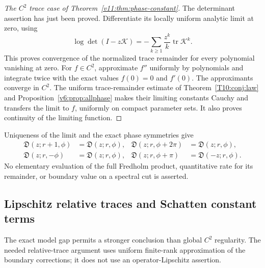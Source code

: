 \begin{proof}[The $C^2$ trace case of Theorem~\ref{v11:thm:phase-constant}]
The determinant assertion has just been proved.  Differentiate its
locally uniform analytic limit at zero, using
\[
 \log\det(I-z\mathcal K)
       =-\sum_{k\ge1}\frac{z^k}{k}\operatorname{tr}\mathcal K^k.
\]
This proves convergence of the normalized trace remainder for every
polynomial vanishing at zero.  For $f\in C^2$, approximate $f''$
uniformly by polynomials and integrate twice with the exact values
$f(0)=0$ and $f'(0)$.  The approximants converge in $C^2$.
The uniform trace-remainder estimate of
Theorem~\ref{T10:conj:law} and Proposition~\ref{v6:prop:allphase}
makes their limiting constants Cauchy and transfers the limit to $f$,
uniformly on compact parameter sets.  It also proves continuity of the
limiting function.
\end{proof}

Uniqueness of the limit and the exact phase symmetries give
\begin{align*}
 \mathfrak D(z;r+1,\phi)&=\mathfrak D(z;r,\phi),&
 \mathfrak D(z;r,\phi+2\pi)&=\mathfrak D(z;r,\phi),\\
 \mathfrak D(z;r,-\phi)&=\mathfrak D(z;r,\phi),&
 \mathfrak D(z;r,\phi+\pi)&=\mathfrak D(-z;r,\phi).
\end{align*}
No elementary evaluation of the full Fredholm product, quantitative
rate for its remainder, or boundary value on a spectral cut is asserted.

\subsection{Lipschitz relative traces and Schatten constant terms}
\label{v11:sec:lip-constants}

The exact model gap permits a stronger conclusion than global $C^2$
regularity.  The needed relative-trace argument uses uniform finite-rank
approximation of the boundary corrections; it does not use an
operator-Lipschitz assertion.

